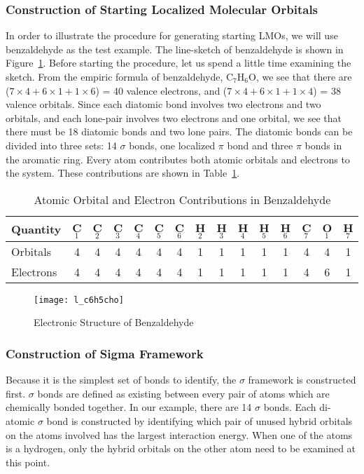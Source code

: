 \subsubsection{Construction of Starting Localized Molecular Orbitals}
In order to illustrate the procedure for generating starting LMOs, we will use
benzaldehyde as the test example.  The line-sketch of benzaldehyde is shown in
Figure~\ref{c6h5cho}.  Before starting the procedure, let us spend a little
time examining the sketch.  From the empiric formula of  benzaldehyde,
C$_7$H$_6$O, we see that there are ($7\times4+6\times1+1\times6$) = 40 valence 
electrons, and ($7\times4+6\times1+1\times4$) = 38 valence orbitals.  Since
each  diatomic bond involves two electrons and two orbitals, and each lone-pair
involves two electrons and one orbital, we see that there must be 18 diatomic
bonds and two lone pairs. The diatomic bonds can be divided into three sets: 14
$\sigma$ bonds, one  localized $\pi$ bond and three $\pi$ bonds in the aromatic
ring. Every atom contributes both atomic orbitals and electrons to the system. 
These contributions are shown in Table~\ref{contrib}.

\begin{table}
\caption{\label{contrib} Atomic Orbital and Electron Contributions in
Benzaldehyde}
\begin{center}
\begin{tabular}{lcccccccccccccc} \hline
Quantity & C$_1$ & C$_2$ & C$_3$ & C$_4$ & C$_5$ & C$_6$ & H$_2$ & H$_3$ & 
H$_4$ & H$_5$ & H$_6$ & C$_7$ & O$_1$ & H$_7$  \\ \hline
Orbitals  & 4 &  4 & 4 & 4 & 4 & 4 & 1 & 1 &  1 &  1 &  1 &  4 & 4 & 1  \\
Electrons & 4 &  4 & 4 & 4 & 4 & 4 & 1 & 1 &  1 &  1 &  1 &  4 & 6 & 1  \\
\hline
\end{tabular}
\end{center}
\end{table}

\begin{figure}
\begin{makeimage}
\end{makeimage}
% 
\begin{center}
\texttt{[image: l\_c6h5cho]}
\end{center}
\caption{\label{c6h5cho} Electronic Structure of Benzaldehyde}
\end{figure}

\subsubsection{Construction of Sigma Framework}
Because it is the simplest set of bonds to identify,  the $\sigma$ framework 
is constructed first.  $\sigma$ bonds are defined as existing between every
pair of atoms which are chemically bonded together.  In our example, there are
14 $\sigma$ bonds.  Each di-atomic $\sigma$ bond is constructed by identifying
which pair of unused hybrid orbitals on the atoms involved has the largest
interaction energy.  When one of the atoms is a hydrogen, only  the hybrid
orbitals on the other atom need to be examined at this point.

